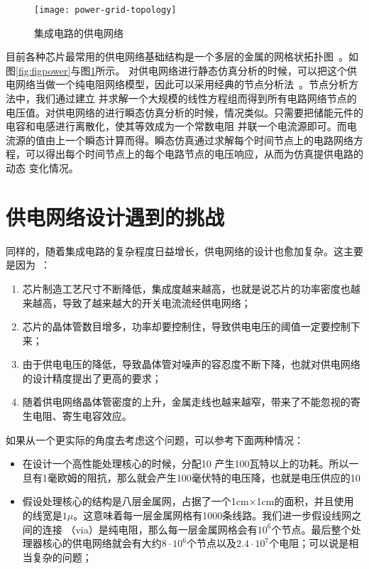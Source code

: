\begin{figure}[H] %
  \centering
  \texttt{[image: power-grid-topology]}
  \caption{集成电路的供电网络}
  \label{fig:figtopology}
\end{figure}

目前各种芯片最常用的供电网络基础结构是一个多层的金属的网格状拓扑图~\cite{popovich2007power}。如图\ref{fig:figpower}与图\ref{fig:figtopology}所示。
对供电网络进行静态仿真分析的时候，可以把这个供电网络当做一个纯电阻网络模型，因此可以采用经典的节点分析法~\cite{vlach1983computer}。节点分析方法中，我们通过建立
并求解一个大规模的线性方程组而得到所有电路网络节点的电压值。对供电网络的进行瞬态仿真分析的时候，情况类似。只需要把储能元件的电容和电感进行离散化，使其等效成为一个常数电阻
并联一个电流源即可。而电流源的值由上一个瞬态计算而得。瞬态仿真通过求解每个时间节点上的电路网络方程，可以得出每个时间节点上的每个电路节点的电压响应，从而为仿真提供电路的动态
变化情况。


\section{供电网络设计遇到的挑战}

同样的，随着集成电路的复杂程度日益增长，供电网络的设计也愈加复杂。这主要是因为~\cite{zhu2004power}：
\begin{enumerate}
    \item 芯片制造工艺尺寸不断降低，集成度越来越高，也就是说芯片的功率密度也越来越高，导致了越来越大的开关电流流经供电网络；
    \item 芯片的晶体管数目增多，功率却要控制住，导致供电电压的阈值一定要控制下来；
    \item 由于供电电压的降低，导致晶体管对噪声的容忍度不断下降，也就对供电网络的设计精度提出了更高的要求；
    \item 随着供电网络晶体管密度的上升，金属走线也越来越窄，带来了不能忽视的寄生电阻、寄生电容效应。
\end{enumerate}

如果从一个更实际的角度去考虑这个问题，可以参考下面两种情况：

\begin{itemize}
\item 在设计一个高性能处理核心的时候，分配10%
产生100瓦特以上的功耗。所以一旦有1毫欧姆的阻抗，那么就会产生100毫伏特的电压降，也就是电压供应的10%
\item 假设处理核心的结构是八层金属网，占据了一个1cm$\times$1cm的面积，并且使用的线宽是$1\mu$。这意味着每一层金属网格有1000条线路。我们进一步假设线网之间的连接
（via）是纯电阻，那么每一层金属网格会有$10^6$个节点。最后整个处理器核心的供电网络就会有大约$8\cdot 10^6$个节点以及$2.4\cdot 10^7$个电阻；可以说是相当复杂的问题；
\end{itemize}

